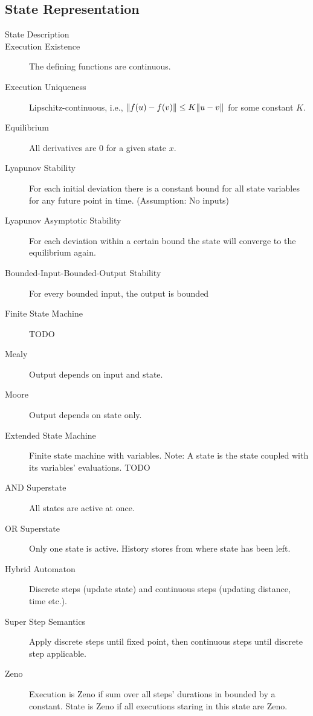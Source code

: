 



\subsection{State Representation}

\begin{description}
	\item[State Description]
	\item[Execution Existence] The defining functions are continuous.
	\item[Execution Uniqueness] Lipschitz-continuous, i.e., $\Vert f(u) - f(v) \Vert 
	\leq K \Vert u - v \Vert$ for some constant $K$.
	\item[Equilibrium] All derivatives are 0 for a given state $x$.
	\item[Lyapunov Stability] For each initial deviation there is a constant 
	bound for all state variables for any future point in time. (Assumption: No
	inputs)
	\item[Lyapunov Asymptotic Stability] For each deviation within a certain bound
	the state will converge to the equilibrium again.
	\item[Bounded-Input-Bounded-Output Stability] For every bounded input, the output is bounded
	\item[Finite State Machine] TODO
	\item[Mealy] Output depends on input and state.
	\item[Moore] Output depends on state only.
	\item[Extended State Machine] Finite state machine with variables. Note: A
	state is the state coupled with its variables' evaluations. TODO
	\item[AND Superstate] All states are active at once.
	\item[OR Superstate] Only one state is active. History stores from where state
	has been left.
	\item[Hybrid Automaton] Discrete steps (\eg update state) and continuous steps
	(\eg updating distance, time etc.).
	\item[Super Step Semantics] Apply discrete steps until fixed point, then
	continuous steps until discrete step applicable.
	\item[Zeno] Execution is Zeno if sum over all steps' durations in bounded by a
	constant. State is Zeno if all executions staring in this state are Zeno.
\end{description}
